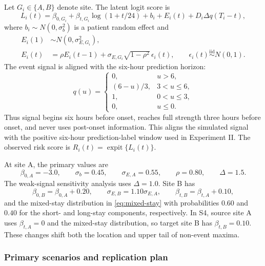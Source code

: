 \documentclass[11pt]{article}
\newcommand{\expit}{\operatorname{expit}}
\begin{document}
Let $G_i\in\{A,B\}$ denote site. The latent logit score is
\begin{equation}
L_i(t)=\beta_{0,G_i}+\beta_{t,G_i}\log(1+t/24)
+b_i+E_i(t)+D_i\Delta q(T_i-t),
\label{eq:score-dgp}
\end{equation}
where $b_i\sim N(0,\sigma_b^2)$ is a patient random effect and
\begin{align}
E_i(1)&\sim N(0,\sigma_{E,G_i}^2),\nonumber\\
E_i(t)&=\rho E_i(t-1)
+\sigma_{E,G_i}\sqrt{1-\rho^2}\,\epsilon_i(t),
\qquad \epsilon_i(t)\stackrel{\mathrm{iid}}{\sim}N(0,1).
\label{eq:score-ar}
\end{align}
The event signal is aligned with the six-hour prediction horizon:
\begin{equation}
q(u)=
\begin{cases}
0,&u>6,\\
(6-u)/3,&3<u\le6,\\
1,&0<u\le3,\\
0,&u\le0.
\end{cases}
\label{eq:event-signal}
\end{equation}
Thus signal begins six hours before onset, reaches full strength three hours before onset, and never uses post-onset information. This aligns the simulated signal with the positive six-hour prediction-label window used in Experiment II. The observed risk score is $R_i(t)=\expit\{L_i(t)\}$.

At site A, the primary values are
\begin{equation}
\beta_{0,A}=-3.0,\qquad
\sigma_b=0.45,\qquad
\sigma_{E,A}=0.55,\qquad
\rho=0.80,\qquad
\Delta=1.5.
\label{eq:score-primary-values}
\end{equation}
The weak-signal sensitivity analysis uses $\Delta=1.0$. Site B has
\begin{equation}
\beta_{0,B}=\beta_{0,A}+0.20,\qquad
\sigma_{E,B}=1.10\sigma_{E,A},\qquad
\beta_{t,B}=\beta_{t,A}+0.10,
\label{eq:site-shift-score}
\end{equation}
and the mixed-stay distribution in \eqref{eq:mixed-stay} with probabilities $0.60$ and $0.40$ for the short- and long-stay components, respectively. In S4, source site A uses $\beta_{t,A}=0$ and the mixed-stay distribution, so target site B has $\beta_{t,B}=0.10$. These changes shift both the location and upper tail of non-event maxima.

\subsubsection{Primary scenarios and replication plan}
\end{document}
